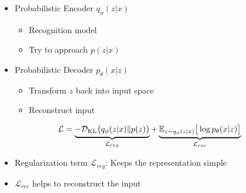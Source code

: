 \documentclass[11pt, a4paper, landscape]{article}
\begin{document}
\vfill
\begin{minipage}[b]{.5\linewidth}
  \begin{itemize}
    \item Probabilistic Encoder $q_\phi(z|x)$
    \begin{itemize}
      \item Recognition model
      \item Try to approach $p(z|x)$
    \end{itemize}
  \end{itemize}
\end{minipage}
\begin{minipage}[b]{.5\linewidth}
  \begin{center}
    \begin{itemize}
    \item Probabilistic Decoder $p_\theta(x|z)$
    \begin{itemize}
      \item Transform $z$ back into input space
      \item Reconstruct input
    \end{itemize}
    \end{itemize}
  \end{center}
\end{minipage}
\vfill

\NewPage{}
\vfill
\begin{equation}
  \mathcal{L} = \underbrace{-\mathcal{D}_{\mathrm{KL}}\big(q_\phi(z|x) \| p(z)\big)}_{\mathcal{L}_{reg}} + \underbrace{\mathbb{E}_{z \sim q_\phi(z|x)}\big[ \log p_\theta(x|z)\big]}_{\mathcal{L}_{rec}}\\
\end{equation}
\begin{itemize}
  \item Regularization term $\mathcal{L}_{reg}$: Keeps the representation simple
  \item $\mathcal{L}_{rec}$ helps to reconstruct the input
\end{itemize}
\vfill
\end{document}
